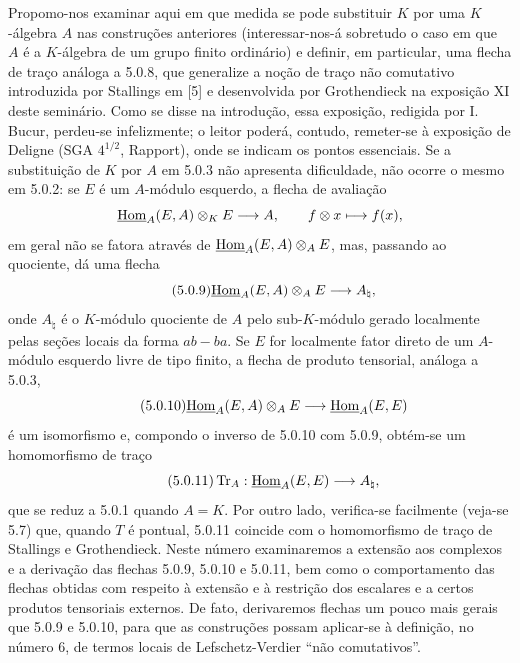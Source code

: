 Propomo-nos examinar aqui em que medida se pode substituir $K$ por uma $K$-álgebra $A$ nas construções anteriores (interessar-nos-á sobretudo o caso em que $A$ é a $K$-álgebra de um grupo finito ordinário) e definir, em particular, uma flecha de traço análoga a 5.0.8, que generalize a noção de traço não comutativo introduzida por Stallings em [5] e desenvolvida por Grothendieck na exposição XI deste seminário. Como se disse na introdução, essa exposição, redigida por I. Bucur, perdeu-se infelizmente; o leitor poderá, contudo, remeter-se à exposição de Deligne (SGA $4^{1/2}$, Rapport), onde se indicam os pontos essenciais. Se a substituição de $K$ por $A$ em 5.0.3 não apresenta dificuldade, não ocorre o mesmo em 5.0.2: se $E$ é um $A$-módulo esquerdo, a flecha de avaliação
\[
\underline{\operatorname{Hom}}_A(E,A)\otimes_KE\longrightarrow A,
\qquad f\otimes x\longmapsto f(x),
\]
em geral não se fatora através de $\underline{\operatorname{Hom}}_A(E,A)\otimes_AE$, mas, passando ao quociente, dá uma flecha
\begin{equation}\tag{5.0.9}
\underline{\operatorname{Hom}}_A(E,A)\otimes_AE\longrightarrow A_\natural,
\end{equation}
onde $A_\natural$ é o $K$-módulo quociente de $A$ pelo sub-$K$-módulo gerado localmente pelas seções locais da forma $ab-ba$. Se $E$ for localmente fator direto de um $A$-módulo esquerdo livre de tipo finito, a flecha de produto tensorial, análoga a 5.0.3,
\begin{equation}\tag{5.0.10}
\underline{\operatorname{Hom}}_A(E,A)\otimes_AE\longrightarrow\underline{\operatorname{Hom}}_A(E,E)
\end{equation}
é um isomorfismo e, compondo o inverso de 5.0.10 com 5.0.9, obtém-se um homomorfismo de traço
\begin{equation}\tag{5.0.11}
\operatorname{Tr}_A:\underline{\operatorname{Hom}}_A(E,E)\longrightarrow A_\natural,
\end{equation}
que se reduz a 5.0.1 quando $A=K$. Por outro lado, verifica-se facilmente (veja-se 5.7) que, quando $T$ é pontual, 5.0.11 coincide com o homomorfismo de traço de Stallings e Grothendieck. Neste número examinaremos a extensão aos complexos e a derivação das flechas 5.0.9, 5.0.10 e 5.0.11, bem como o comportamento das flechas obtidas com respeito à extensão e à restrição dos escalares e a certos produtos tensoriais externos. De fato, derivaremos flechas um pouco mais gerais que 5.0.9 e 5.0.10, para que as construções possam aplicar-se à definição, no número 6, de termos locais de Lefschetz-Verdier ``não comutativos''.

